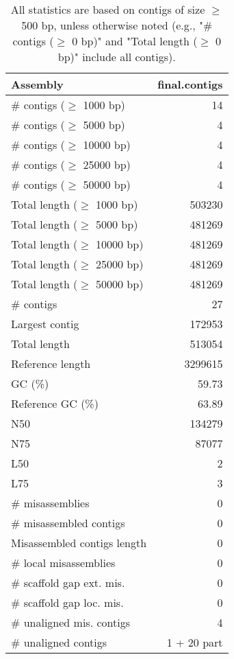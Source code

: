 \documentclass[12pt,a4paper]{article}
\begin{document}
\begin{table}[ht]
\begin{center}
\caption{All statistics are based on contigs of size $\geq$ 500 bp, unless otherwise noted (e.g., "\# contigs ($\geq$ 0 bp)" and "Total length ($\geq$ 0 bp)" include all contigs).}
\begin{tabular}{|l*{1}{|r}|}
\hline
Assembly & final.contigs \\ \hline
\# contigs ($\geq$ 1000 bp) & 14 \\ \hline
\# contigs ($\geq$ 5000 bp) & 4 \\ \hline
\# contigs ($\geq$ 10000 bp) & 4 \\ \hline
\# contigs ($\geq$ 25000 bp) & 4 \\ \hline
\# contigs ($\geq$ 50000 bp) & 4 \\ \hline
Total length ($\geq$ 1000 bp) & 503230 \\ \hline
Total length ($\geq$ 5000 bp) & 481269 \\ \hline
Total length ($\geq$ 10000 bp) & 481269 \\ \hline
Total length ($\geq$ 25000 bp) & 481269 \\ \hline
Total length ($\geq$ 50000 bp) & 481269 \\ \hline
\# contigs & 27 \\ \hline
Largest contig & 172953 \\ \hline
Total length & 513054 \\ \hline
Reference length & 3299615 \\ \hline
GC (\%) & 59.73 \\ \hline
Reference GC (\%) & 63.89 \\ \hline
N50 & 134279 \\ \hline
N75 & 87077 \\ \hline
L50 & 2 \\ \hline
L75 & 3 \\ \hline
\# misassemblies & 0 \\ \hline
\# misassembled contigs & 0 \\ \hline
Misassembled contigs length & 0 \\ \hline
\# local misassemblies & 0 \\ \hline
\# scaffold gap ext. mis. & 0 \\ \hline
\# scaffold gap loc. mis. & 0 \\ \hline
\# unaligned mis. contigs & 4 \\ \hline
\# unaligned contigs & 1 + 20 part \\ \hline

\end{tabular}
\end{center}
\end{table}
\end{document}
